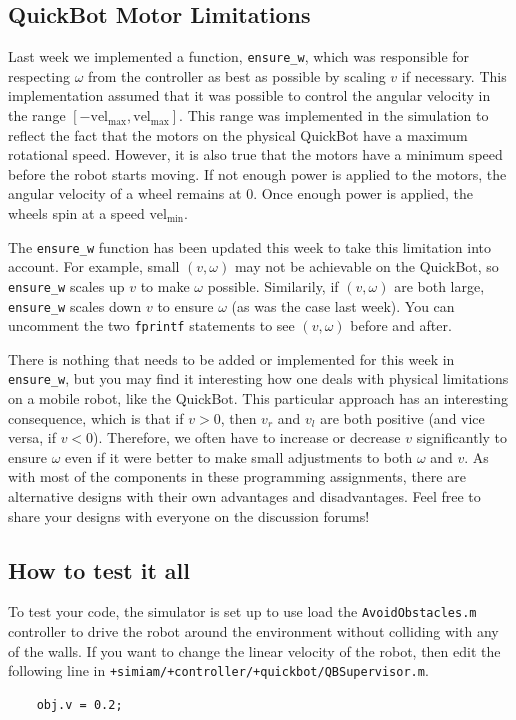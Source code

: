 \documentclass[10pt]{article}
\begin{document}
\subsection*{QuickBot Motor Limitations}

Last week we implemented a function, \texttt{ensure\_w}, which was responsible for respecting $\omega$ from the controller as best as possible by scaling $v$ if necessary. This implementation assumed that it was possible to control the angular velocity in the range $[-\text{vel}_{\max},\text{vel}_{\max}]$. This range was implemented in the simulation to reflect the fact that the motors on the physical QuickBot have a maximum rotational speed. However, it is also true that the motors have a minimum speed before the robot starts moving. If not enough power is applied to the motors, the angular velocity of a wheel remains at $0$. Once enough power is applied, the wheels spin at a speed $\text{vel}_{\min}$.

The \texttt{ensure\_w} function has been updated this week to take this limitation into account. For example, small $(v,\omega)$ may not be achievable on the QuickBot, so \texttt{ensure\_w} scales up $v$ to make $\omega$ possible. Similarily, if $(v,\omega)$ are both large, \texttt{ensure\_w} scales down $v$ to ensure $\omega$ (as was the case last week). You can uncomment the two \texttt{fprintf} statements to see $(v,\omega)$ before and after.

There is nothing that needs to be added or implemented for this week in \texttt{ensure\_w}, but you may find it interesting how one deals with physical limitations on a mobile robot, like the QuickBot. This particular approach has an interesting consequence, which is that if $v>0$, then $v_r$ and $v_l$ are both positive (and vice versa, if $v<0$). Therefore, we often have to increase or decrease $v$ significantly to ensure $\omega$ even if it were better to make small adjustments to both $\omega$ and $v$. As with most of the components in these programming assignments, there are alternative designs with their own advantages and disadvantages. Feel free to share your designs with everyone on the discussion forums!

\subsection*{How to test it all}

To test your code, the simulator is set up to use load the \texttt{AvoidObstacles.m} controller to drive the robot around the environment without colliding with any of the walls. If you want to change the linear velocity of the robot, then edit the following line in \texttt{+simiam/+controller/}\texttt{+quickbot/QBSupervisor.m}.
  \begin{verbatim}
    obj.v = 0.2;\end{verbatim}
\end{document}
